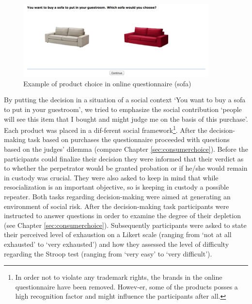 \begin{figure}[h!]
\center
	\includegraphics[width=0.9\textwidth]{images/os_product_choice.png}
  \caption{Example of product choice in online questionnaire (sofa)}\label{fig:os_product_choice}
\end{figure}
By putting the decision in a situation of a social context ‘You want to buy a sofa to put in your guestroom’, we tried to emphasize the social contribution ‘people will see this item that I bought and might judge me on the basis of this purchase’. Each product was placed in a dif-ferent social framework\footnote{In order not to violate any trademark rights, the brands in the online questionnaire have been removed. Howev-er, some of the products posses a high recognition factor and might influence the participants after all.}. After the decision-making task based on purchases the questionnaire proceeded with questions based on the judges’ dilemma (compare Chapter \ref{sec:consumerchoice}). Before the participants could finalize their decision they were informed that their verdict as to whether the perpetrator would be granted probation or if he/she would remain in custody was crucial. They were also asked to keep in mind that while resocialization is an important objective, so is keeping in custody a possible repeater. Both tasks regarding decision-making were aimed at generating an environment of social risk. After the decision-making task participants were instructed to answer questions in order to examine the degree of their depletion (see Chapter \ref{sec:consumerchoice}). Subsequently participants were asked to state their perceived level of exhaustion on a Likert scale (ranging from ‘not at all exhausted’ to ‘very exhausted’) and how they assessed the level of difficulty regarding the Stroop test (ranging from ‘very easy’ to ‘very difficult’).